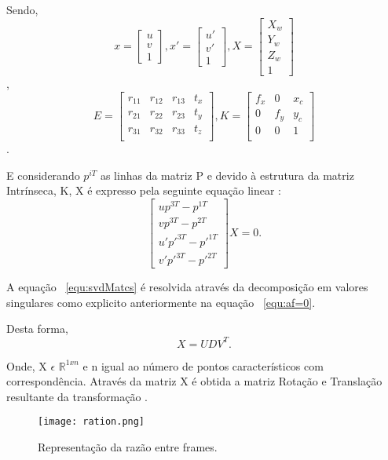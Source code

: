 Sendo, \[ x =  \left[ \begin{array}{ccc} u \\ v \\ 1 \end{array} \right],  x' =  \left[ \begin{array}{ccc} u' \\ v' \\ 1 \end{array} \right] ,  X =  \left[ \begin{array}{cccc} X_w \\ Y_w \\ Z_w \\ 1 \end{array} \right] \], \[ E =  \left[ \begin{array}{cccc} r_{11} & r_{12} & r_{13} & t_{x} \\ r_{21} & r_{22} & r_{23} & t_{y} \\ r_{31} & r_{32} & r_{33} & t_{z} \\ \end{array} \right] , K =  \left[ \begin{array}{ccc} f_x & 0 & x_c \\ 0 & f_y & y_c \\ 0 & 0 & 1 \\ \end{array} \right] \].

E considerando $p^{iT}$ as linhas da matriz P e devido à estrutura da matriz Intrínseca, K, X é expresso pela seguinte equação linear :  \begin{equation}\label{equ:svdMatcs} 
\left[ \begin{array}{cccc}
up^{3T} - p^{1T} \\
vp^{3T} - p^{2T} \\
u'p'^{3T} - p'^{1T} \\
v'p'^{3T} - p'^{2T} 
\end{array} \right] X = 0 .
\end{equation}

A equação ~\ref{equ:svdMatcs} é resolvida através da decomposição em valores singulares como explicito anteriormente na equação ~\ref{equ:af=0}.

Desta forma, \[ X = UDV^T. \] 

Onde, X $\epsilon$ $\mathbb{R}^{1xn}$ e n igual ao número de pontos característicos com correspondência.
Através da matriz X é obtida a matriz Rotação e Translação resultante da transformação .

\begin{figure}[h!] %
	\begin{center}
		\leavevmode		
		\texttt{[image: ration.png]}
		\caption{Representação da razão entre frames.}
		\label{fig:ration}
	\end{center}
\end{figure}

